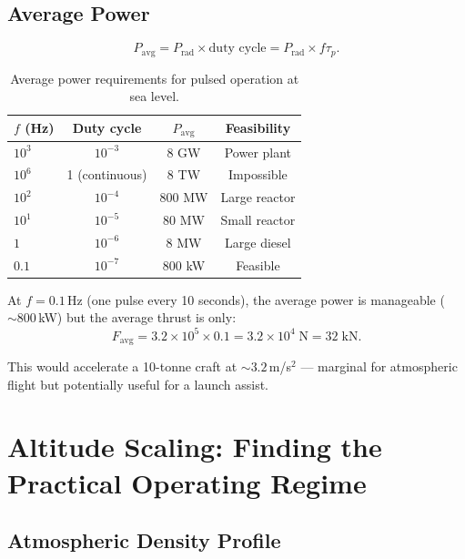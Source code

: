\documentclass[12pt,a4paper]{article}
\begin{document}
\subsection{Average Power}

\begin{equation}
  P_{\text{avg}} = P_{\text{rad}} \times \text{duty cycle} = P_{\text{rad}} \times f \tau_p.
\end{equation}

\begin{table}[h]
\centering
\begin{tabular}{@{}lccc@{}}
\toprule
$f$ (Hz) & Duty cycle & $P_{\text{avg}}$ & Feasibility \\
\midrule
$10^3$ & $10^{-3}$ & 8 GW & Power plant \\
$10^6$ & 1 (continuous) & 8 TW & Impossible \\
$10^2$ & $10^{-4}$ & 800 MW & Large reactor \\
$10^1$ & $10^{-5}$ & 80 MW & Small reactor \\
$1$ & $10^{-6}$ & 8 MW & Large diesel \\
$0.1$ & $10^{-7}$ & 800 kW & Feasible \\
\bottomrule
\end{tabular}
\caption{Average power requirements for pulsed operation at sea level.}
\end{table}

At $f = 0.1$\,Hz (one pulse every 10 seconds), the average power is manageable
($\sim 800$\,kW) but the average thrust is only:
\begin{equation}
  F_{\text{avg}} = 3.2\times10^5 \times 0.1 = 3.2 \times 10^4 \; \text{N} = 32 \; \text{kN}.
\end{equation}

This would accelerate a 10-tonne craft at $\sim 3.2$\,m/s$^2$ --- marginal for
atmospheric flight but potentially useful for a launch assist.

\section{Altitude Scaling: Finding the Practical Operating Regime}
\label{sec:altitude}

\subsection{Atmospheric Density Profile}
\end{document}
